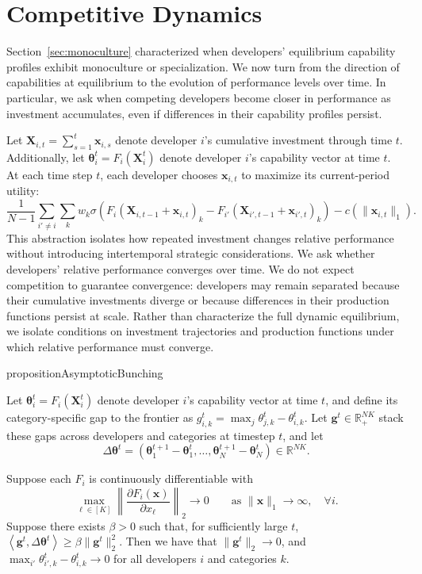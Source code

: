 \section{Competitive Dynamics}
\label{sec:dynamics}
Section~\ref{sec:monoculture} characterized when developers' equilibrium capability profiles exhibit monoculture or specialization. 
We now turn from the direction of capabilities at equilibrium to the evolution of performance levels over time. 
In particular, we ask when competing developers become closer in performance as investment accumulates, even if differences in their capability profiles persist.

Let $\mathbf{X}_{i,t} = \sum_{s=1}^t \mathbf{x}_{i,s}$
denote developer $i$'s cumulative investment through time $t$.
Additionally, let $\boldsymbol{\theta}_i^t = F_i(\mathbf X_i^t)$ denote developer $i$'s capability vector at time $t$.
At each time step $t$, each developer chooses $\mathbf{x}_{i,t}$ to maximize its current-period utility:
\[
\frac{1}{N-1}
\sum_{i'\neq i}\sum_k
w_k
\sigma\!\left(
F_i(\mathbf{X}_{i,t-1}+\mathbf{x}_{i,t})_k
-
F_{i'}(\mathbf{X}_{i',t-1}+\mathbf{x}_{i',t})_k
\right)
-
c(\|\mathbf{x}_{i,t}\|_1).
\]
This abstraction isolates how repeated investment changes relative performance without introducing intertemporal strategic considerations. 
We ask whether developers’ relative performance converges over time.
We do not expect competition to guarantee convergence: developers may remain separated because their cumulative investments diverge or because differences in their production functions persist at scale.
Rather than characterize the full dynamic equilibrium, we isolate conditions on investment trajectories and production functions under which relative performance must converge.

\begin{restatable}
{proposition}{AsymptoticBunching}
\label{prop:AsymptoticBunching}

Let $\boldsymbol{\theta}_i^t = F_i(\mathbf{X}_i^t)$ denote developer $i$'s capability vector at time $t$, and define its category-specific gap to the frontier as $g_{i,k}^t=\max_j \theta_{j,k}^t-\theta_{i,k}^t.$
Let $\mathbf g^t\in\mathbb R_+^{NK}$ stack these gaps across developers and
categories at timestep $t$, and let
\[
\Delta\boldsymbol{\theta}^t
=
\left(
\boldsymbol{\theta}_1^{t+1}-\boldsymbol{\theta}_1^t,
\ldots,
\boldsymbol{\theta}_N^{t+1}-\boldsymbol{\theta}_N^t
\right)
\in\mathbb R^{NK}.
\]

Suppose each $F_i$ is continuously differentiable with
\[
\max_{\ell\in[K]} \left\| \frac{\partial F_i(\mathbf x)}{\partial x_\ell} \right\|_2 \to 0 \qquad \text{as }\|\mathbf x\|_1\to\infty, \quad \forall i.
\]
Suppose there exists $\beta>0$ such that, for sufficiently large $t$, $\left\langle
\mathbf g^t,\Delta\boldsymbol{\theta}^t
\right\rangle
\ge
\beta\|\mathbf g^t\|_2^2$.
Then we have that $\|\mathbf g^t\|_2\to 0$, and $\max_{i'}\theta_{{i'},k}^t-\theta_{i,k}^t
\to 0$ for all developers $i$ and categories $k$. 
\end{restatable}

